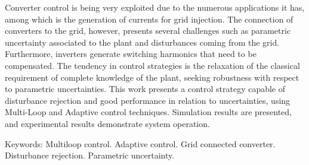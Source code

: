
	Converter control is being very exploited due to the numerous applications it has, among which is the generation of currents for grid injection. The connection of converters to the grid, however, presents several challenges such as parametric uncertainty associated to the plant and disturbances coming from the grid. Furthermore, inverters generate switching harmonics that need to be compensated. The tendency in control strategies is the relaxation of the classical requirement of complete knowledge of the plant, seeking robustness with respect to parametric uncertainties. This work presents a control strategy capable of disturbance rejection and good performance in relation to uncertainties, using Multi-Loop and Adaptive control techniques. Simulation results are presented, and experimental results demonstrate system operation.

 \vspace{\onelineskip}

 \noindent
 Keywords: Multiloop control. Adaptive control. Grid connected converter. Disturbance rejection. Parametric uncertainty.

